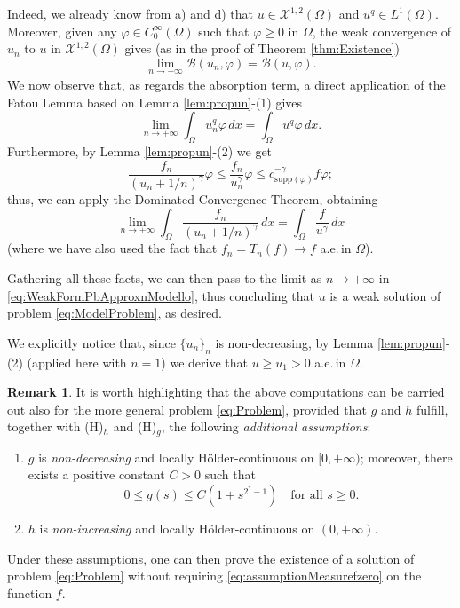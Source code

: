 \documentclass[11pt,a4paper]{amsart}
\theoremstyle{definition}
\newtheorem{remark}[definition]{Remark}
\theoremstyle{plain}
\numberwithin{equation}{section}
\begin{document}
{Indeed, we already know from a) and d) that $u\in\mathcal{X}^{1,2}(\Omega)$ and
$u^q\in L^1(\Omega)$. Moreover, given any 
$\varphi\in C_0^\infty(\Omega)$ such that
$\varphi\geq 0$ in $\Omega$, the weak convergence
of $u_n$ to $u$ in $\mathcal{X}^{1,2}(\Omega)$ gives (as in the
proof of Theorem \ref{thm:Existence})
$$\lim_{n\to+\infty}\mathcal{B}(u_n,\varphi) = \mathcal{B}(u,\varphi).$$
We now observe that, as regards the absorption term, a direct application
of the Fatou Lemma  based on Lemma \ref{lem:propun}-(1) gives
$$\lim_{n\to+\infty}\int_\Omega u_n^q\varphi\,dx = \int_\Omega u^q\varphi\,dx.$$
Furthermore, by Lemma \ref{lem:propun}-(2) we get
$$\frac{f_n}{(u_n+1/n)^\gamma}\varphi\leq \frac{f_n}{u_n^\gamma}\varphi\leq 
c_{\mathrm{supp}(\varphi)}^{-\gamma}f\varphi;$$
thus, we can apply the Dominated Convergence  Theorem, obtaining
$$\lim_{n\to+\infty}\int_{\Omega}\frac{f_n}{(u_n+1/n)^\gamma}\,dx
= \int_\Omega\frac{f}{u^\gamma}\,dx$$
(where we have also used the fact that $f_n = T_n(f)\to f$ a.e.\,in $\Omega$).
\vspace*{0.1cm}

Gathering all these facts, we can then pass to the limit as $n\to+\infty$
in \eqref{eq:WeakFormPbApproxnModello}, 
thus concluding that $u$ is a weak solution of problem \eqref{eq:ModelProblem},
as desired.
\vspace*{0.1cm}

We explicitly notice that, since $\{u_n\}_n$ is non-decreasing, by Lemma \ref{lem:propun}-(2)
(ap\-pl\-ied here with $n = 1$) we derive that $u\geq u_1 > 0$ a.e.\,in $\Omega$.
\begin{remark} \label{rem:GeneralAppendix}
	It is worth highlighting that the above computations can be carried out also for the more general problem \eqref{eq:Problem}, provided that
	$g$ and $h$ fulfill, together with (H)$_h$ and (H)$_g$, the following \emph{additional assumptions}:
	\begin{enumerate}
		\item $g$ is \emph{non-decreasing} and locally H\"older-continuous on $[0,+\infty)$; moreover, there exists a positive constant $C > 0$ such that	
$$0\leq g(s)\leq C(1+s^{2^*-1})\quad \text{for all $s\geq 0$}.$$
\item $h$ is \emph{non-increasing} and locally H\"older-continuous on $(0,+\infty)$.
\end{enumerate}
	Under these assumptions, one can then prove
	the existence of a solution of problem \eqref{eq:Problem} without requiring \eqref{eq:assumptionMeasurefzero} on the function $f$.
	\end{remark}
  
}
\end{document}
